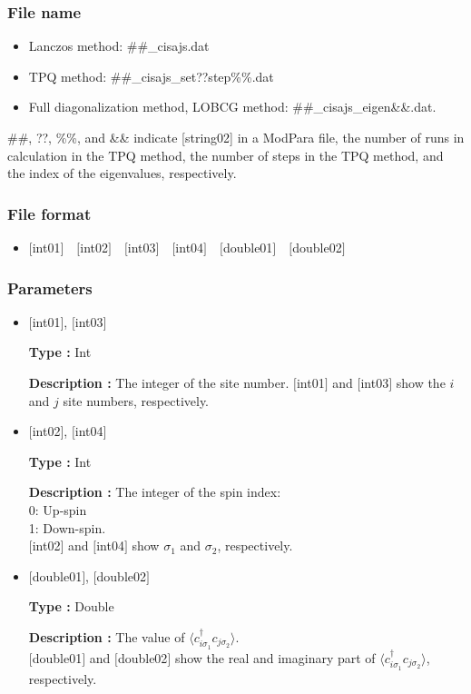 \subsubsection{File name}
 \begin{itemize}
   \item{Lanczos method:}  \#\#\_cisajs.dat
   \item{TPQ method:} \#\#\_cisajs\_set??step\%\%.dat
   \item{Full diagonalization method, LOBCG method:}  \#\#\_cisajs\_eigen{\&\&}.dat.
  \end{itemize}
  \#\#, ??, \%\%, and \&\& indicate [string02] in a ModPara file, the number of runs in calculation in the TPQ method, the number of steps in the TPQ method, and the index of the eigenvalues, respectively.


\subsubsection{File format}
 \begin{itemize}
   \item  $[$int01$]$~~$[$int02$]$~~$[$int03$]$~~$[$int04$]$~~$[$double01$]$~~$[$double02$]$
  \end{itemize}
\subsubsection{Parameters}
 \begin{itemize}

  \item  $[$int01$]$, $[$int03$]$

 {\bf Type :} Int

{\bf Description :} The integer of the site number. $[$int01$]$ and $[$int03$]$ show the $i$ and $j$ site numbers, respectively.
 
  \item  $[$int02$]$, $[$int04$]$

 {\bf Type :} Int 

{\bf Description :} The integer of the spin index:\\
   0: Up-spin\\
   1: Down-spin.\\ 
$[$int02$]$ and $[$int04$]$ show $\sigma_1$ and $\sigma_2$, respectively. \\

  \item  $[$double01$]$, $[$double02$]$

 {\bf Type :} Double 

{\bf Description :} The value of $\langle c_{i\sigma_1}^{\dagger}c_{j\sigma_2}\rangle$.\\
$[$double01$]$ and $[$double02$]$ show the real and imaginary part of $\langle c_{i\sigma_1}^{\dagger}c_{j\sigma_2}\rangle$, respectively.
\end{itemize}

